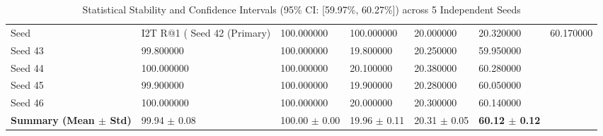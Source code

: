 \begin{table}
\caption{Statistical Stability and Confidence Intervals (95\% CI: [59.97\%, 60.27\%]) across 5 Independent Seeds}
\label{tab:seed_statistics}
\begin{tabular}{llllll}
\toprule
Seed & I2T R@1 (%
\midrule
Seed 42 (Primary) & 100.000000 & 100.000000 & 20.000000 & 20.320000 & 60.170000 \\
Seed 43 & 99.800000 & 100.000000 & 19.800000 & 20.250000 & 59.950000 \\
Seed 44 & 100.000000 & 100.000000 & 20.100000 & 20.380000 & 60.280000 \\
Seed 45 & 99.900000 & 100.000000 & 19.900000 & 20.280000 & 60.050000 \\
Seed 46 & 100.000000 & 100.000000 & 20.000000 & 20.300000 & 60.140000 \\
\textbf{Summary (Mean $\pm$ Std)} & 99.94 $\pm$ 0.08 & 100.00 $\pm$ 0.00 & 19.96 $\pm$ 0.11 & 20.31 $\pm$ 0.05 & \textbf{60.12 $\pm$ 0.12} \\
\bottomrule
\end{tabular}
\end{table}
